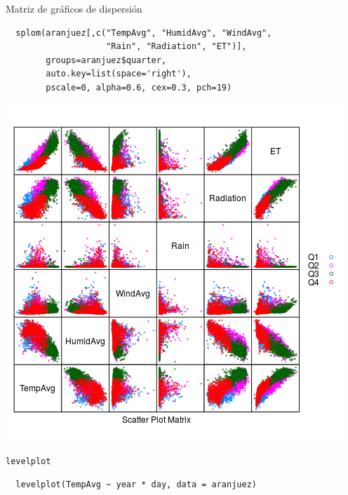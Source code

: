 \documentclass[xcolor={usenames,svgnames,dvipsnames}]{beamer}
\begin{document}
\begin{frame}[fragile,label=sec-2-1-32]{Matriz de gráficos de dispersión}
 \lstset{language=R,label= ,caption= ,numbers=none}
\begin{lstlisting}
  splom(aranjuez[,c("TempAvg", "HumidAvg", "WindAvg",
                    "Rain", "Radiation", "ET")],
        groups=aranjuez$quarter,
        auto.key=list(space='right'),
        pscale=0, alpha=0.6, cex=0.3, pch=19)
\end{lstlisting}
\end{frame}

\begin{frame}[label=sec-2-1-33]{}
\includegraphics[width=.9\linewidth]{figs/splomGroup.png}
\end{frame}

\begin{frame}[fragile,label=sec-2-1-34]{\texttt{levelplot}}
 \lstset{language=R,label= ,caption= ,numbers=none}
\begin{lstlisting}
  levelplot(TempAvg ~ year * day, data = aranjuez)
\end{lstlisting}
\end{frame}
\end{document}

